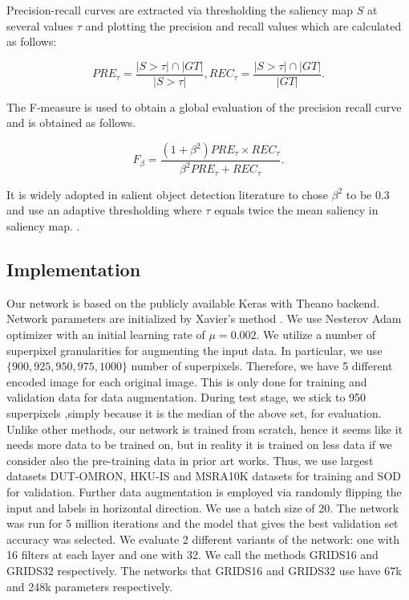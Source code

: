 \documentclass[a4paper,conference]{IEEEtran}
\begin{document}
Precision-recall curves are extracted via thresholding the saliency map $S$ at several values $\tau$ and plotting the precision and recall values which are calculated as follows:

\begin{equation}
PRE_\tau=\frac{|S>\tau|\cap|GT|}{|S>\tau|},  REC_\tau=\frac{|S>\tau|\cap|GT|}{|GT|}.
\label{eqn4}
\end{equation}

The F-measure is used to obtain a global evaluation of the precision recall curve and is obtained as follows.

\begin{equation}
F_\beta=\frac{(1+\beta^2)PRE_\tau \times REC_\tau}{\beta^2PRE_\tau+REC_\tau}.
\label{eqn5}
\end{equation}

It is widely adopted in salient object detection literature to chose $\beta^2$ to be $0.3$ and use an adaptive thresholding where $\tau$ equals twice the mean saliency in saliency map. \cite{Borji1}.

\subsection{Implementation}
Our network is based on the publicly available Keras with Theano backend.
Network parameters are initialized by Xavier's method \cite{Xavier}.
We use Nesterov Adam optimizer with an initial learning rate of $\mu=0.002$.
We utilize a number of superpixel granularities for augmenting the input data.
In particular, we use $\{900,925,950,975,1000\}$ number of superpixels.
Therefore, we have 5 different encoded image for each original image.
This is only done for training and validation data for data augmentation.
During test stage, we stick to 950 superpixels ,simply because it is the median of the above set, for evaluation.
Unlike other methods, our network is trained from scratch, hence it seems like it needs more data to be trained on, but in reality it is trained on less data if we consider also the pre-training data in prior art works.
Thus, we use largest datasets DUT-OMRON, HKU-IS and MSRA10K datasets for training and SOD for validation.
Further data augmentation is employed via randomly flipping the input and labels in horizontal direction.
We use a batch size of 20.
The network was run for 5 million iterations and the model that gives the best validation set accuracy was selected.
We evaluate 2 different variants of the network: one with 16 filters at each layer and one with 32.
We call the methods GRIDS16 and GRIDS32 respectively.
The networks that GRIDS16 and GRIDS32 use have 67k and 248k parameters respectively.
\end{document}
